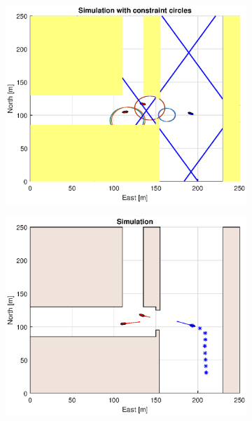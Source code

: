 \begin{figure}[ht]
    \hfill
    \\
    \begin{subfigure}[b]{0.49\textwidth}
        \centering
        \includegraphics[width=\textwidth]{Images/Figures/Havn1/Simple1_f1_Frame6}
    \end{subfigure}
    \hfill
    \begin{subfigure}[b]{0.499\textwidth}
        \centering
        \includegraphics[width=\textwidth]{Images/Figures/Havn1/Simple1_f600_Frame6}
    \end{subfigure}

\end{figure}
